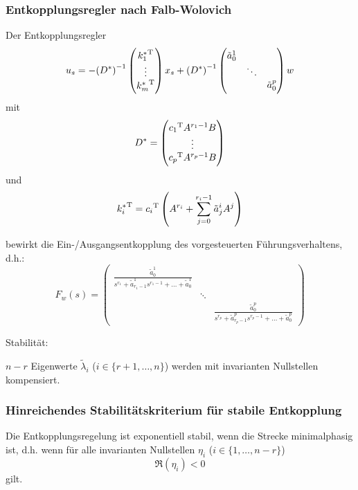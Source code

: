 \subsubsection{Entkopplungsregler nach Falb-Wolovich}
Der Entkopplungsregler 
\begin{equation}
    u_s = - {(D^*)}^{-1} \begin{pmatrix}
            {k_1^*}^\text{T} \\ \vdots \\ {k_m^*}^\text{T}
        \end{pmatrix} x_s +
        {(D^*)}^{-1} \begin{pmatrix}
            \tilde{a}_0^1 \\
             & \ddots \\
             & & \tilde{a}_0^p
        \end{pmatrix} w
\end{equation}
mit
\begin{equation}
    D^* = \begin{pmatrix}
            {c_1}^\text{T} A^{r_1-1} B \\
            \vdots \\
            {c_p}^\text{T} A^{r_p-1} B \\
        \end{pmatrix}
\end{equation}
und
\begin{equation}
    {k^*_i}^\text{T} = {c_i}^\text{T} \left(A^{r_i} + \sum_{j=0}^{r_i-1} \tilde{a}_j^i A^j \right)
\end{equation}

bewirkt die Ein-/Ausgangsentkopplung des vorgesteuerten Führungsverhaltens, d.h.:
\begin{equation}
    F_w(s) = \begin{pmatrix}
        \frac{\tilde{a}_0^1}{s^{r_1} + \tilde{a}^1_{r_1-1} s^{r_1-1} + \ldots + \tilde{a}_0^1} \\
        & \ddots \\
        & & \frac{\tilde{a}_0^p}{s^{r_p} + \tilde{a}^p_{r_p-1} s^{r_p-1} + \ldots + \tilde{a}_0^p} 
    \end{pmatrix}
\end{equation}

Stabilität:

$n-r$ Eigenwerte $\tilde{\lambda}_i$ ($i\in\{r+1, \ldots, n\}$) werden mit invarianten
Nullstellen kompensiert.

\subsubsection{Hinreichendes Stabilitätskriterium für stabile Entkopplung}
Die Entkopplungsregelung ist exponentiell stabil, wenn die Strecke minimalphasig ist,
d.h. wenn für alle invarianten Nullstellen $\eta_i$ ($i\in \{1, \ldots, n-r\}$)
\begin{equation}
    \Re(\eta_i) < 0
\end{equation}
gilt.

